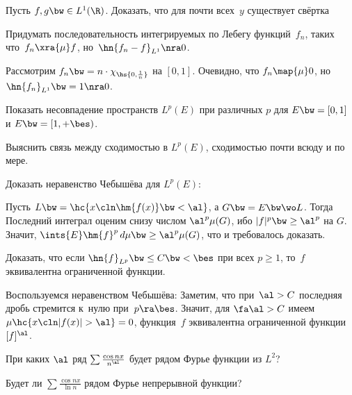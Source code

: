 \documentclass[a4paper]{article}
\begin{document}
\begin{problem}
  Пусть $f, g\bw\in L^1(\R)$. Доказать, что для почти всех~$y$ существует свёртка
\end{problem}

\begin{problem}
  Придумать последовательность интегрируемых по Лебегу функций~$f_n$, таких что~$f_n\xra{\mu} f$,
  но~$\hn{f_n - f}_{L^1} \nra 0$.
\end{problem}
\begin{solution}
  Рассмотрим $f_n \bw= n\cdot \chi_{\hs{0,\frac1n}}$ на $[0,1]$. Очевидно, что $f_n\map{\mu} 0$,
  но $\hn{f_n}_{L^1} \bw= 1 \nra 0$.
\end{solution}

\begin{problem}
  Показать несовпадение пространств $L^p(E)$ при различных $p$ для $E\bw=[0,1]$ и $E \bw= [1, +\bes)$.
\end{problem}

\begin{problem}
  Выяснить связь между сходимостью в $L^p(E)$, сходимостью почти всюду и по мере.
\end{problem}

\begin{problem}
  Доказать неравенство Чебышёва для $L^p(E)$:
\end{problem}
\begin{solution}
  Пусть $L \bw= \hc{x\cln \hm{f(x)} \bw< \al}$, а $G \bw= E \bw\wo L$. Тогда
  Последний интеграл оценим снизу числом $\al^p \mu(G)$, ибо $|f|^p \bw\ge \al^p$ на $G$.
  Значит, $\ints{E} \hm{f}^p\,d\mu \bw\ge \al^p \mu(G)$, что и требовалось доказать.
\end{solution}

\begin{problem}
  Доказать, что если $\hn{f}_{L^p} \bw\le C \bw< \bes$ при всех $p \ge 1$, то~$f$
  эквивалентна ограниченной функции.
\end{problem}
\begin{solution}
  Воспользуемся неравенством Чебышёва:
  Заметим, что при~$\al > C$ последняя дробь стремится к~нулю при~$p\ra\bes$. Значит,
  для $\fa \al > C$ имеем $\mu\hc{x\cln |f(x)| > \al} = 0$,
   функция~$f$ эквивалентна ограниченной функции~$[f]^\al$.
\end{solution}

\begin{problem}
  При каких $\al$ ряд $\sum \frac{\cos nx}{n^{\al}}$ будет рядом Фурье функции из $L^2$?
\end{problem}

\begin{problem}
  Будет ли $\sum \frac{\cos nx}{\ln n}$ рядом Фурье непрерывной функции?
\end{problem}

\medskip\dmvntrail
\end{document}
